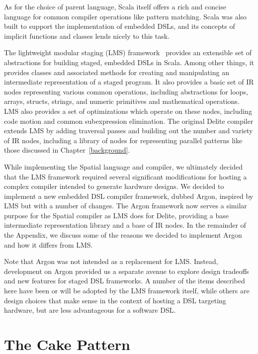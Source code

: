 As for the choice of parent language,
Scala itself offers a rich and concise language for common
compiler operations like pattern matching. Scala was also built to support
the implementation of embedded DSLs, and its concepts of implicit functions
and classes lends nicely to this task.

The lightweight modular staging (LMS) framework~\cite{lms} provides an
extensible set of abstractions for building staged, embedded DSLs in
Scala. Among other things, it provides classes and associated methods for creating
and manipulating an intermediate representation of a staged program.
It also provides a basic set of IR nodes representing various common operations,
including abstractions for loops, arrays, structs, strings, and numeric primitives
and mathematical operations.
LMS also provides a set of optimizations which operate on these nodes,
including code motion and common subexpression elimination.
The original Delite compiler extends LMS by adding traversal passes and
building out the number and variety of IR nodes, including a library of nodes
for representing parallel patterns like those discussed in Chapter~\ref{background}.

While implementing the Spatial language and compiler,
we ultimately decided that the LMS framework required several significant
modifications for hosting a complex compiler intended to generate hardware designs.
We decided to implement a new embedded DSL compiler framework, dubbed Argon,
inspired by LMS but with a number of changes.
The Argon framework now serves a similar purpose for the Spatial compiler
as LMS does for Delite,
providing a base intermediate representation library and a base of IR nodes.
In the remainder of the Appendix, we discuss some of the reasons
we decided to implement Argon and how it differs from LMS.

Note that Argon was not intended as a replacement for LMS.
Instead, development on Argon provided us a separate
avenue to explore design tradeoffs and new features for staged DSL frameworks.
A number of the items described here have been or will be adopted
by the LMS framework itself, while others are design choices that
make sense in the context of hosting a DSL targeting hardware,
but are less advantageous for a software DSL.

\section{The Cake Pattern}


